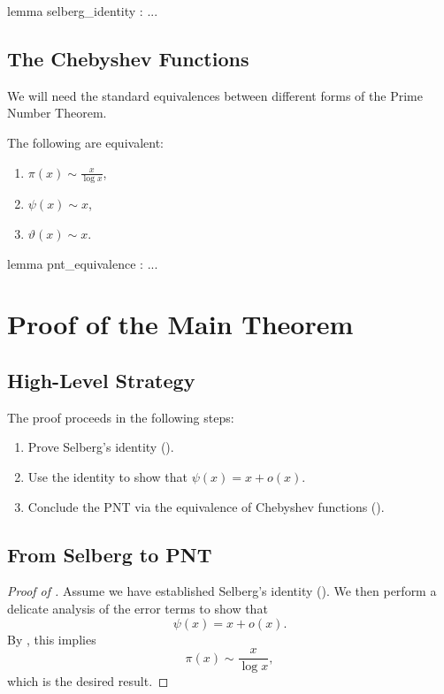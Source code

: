 \documentclass{report}
\begin{document}
\begin{leanok}
  lemma selberg_identity : ...
\end{leanok}

\section{The Chebyshev Functions}

We will need the standard equivalences between different forms of the Prime Number Theorem.

\begin{lemma}\label{lem:pnt_equivalence}
  The following are equivalent:
  \begin{enumerate}
    \item $\pi(x) \sim \frac{x}{\log x}$,
    \item $\psi(x) \sim x$,
    \item $\vartheta(x) \sim x$.
  \end{enumerate}
\end{lemma}

\begin{leanok}
  lemma pnt_equivalence : ...
\end{leanok}

\chapter{Proof of the Main Theorem}

\section{High-Level Strategy}

The proof proceeds in the following steps:
\begin{enumerate}
  \item Prove Selberg's identity ().
  \item Use the identity to show that $\psi(x) = x + o(x)$.
  \item Conclude the PNT via the equivalence of Chebyshev functions ().
\end{enumerate}

\section{From Selberg to PNT}

\begin{proof}[Proof of ]
  Assume we have established Selberg's identity ().
  We then perform a delicate analysis of the error terms to show that
  \[
  \psi(x) = x + o(x).
  \]
  By , this implies
  \[
  \pi(x) \sim \frac{x}{\log x},
  \]
  which is the desired result.
\end{proof}

\end{document}
